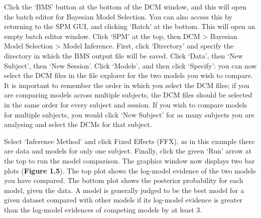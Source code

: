 Click the `BMS' button at the bottom of the DCM window, and this will
open the batch editor for Bayesian Model Selection. You can also access
this by returning to the SPM GUI, and clicking `Batch' at the bottom.
This will open an empty batch editor window. Click `SPM' at the top,
then DCM \textgreater{} Bayesian Model Selection \textgreater{} Model
Inference. First, click `Directory' and specify the directory in which
the BMS output file will be saved. Click `Data', then `New Subject',
then `New Session'. Click `Models', and then click `Specify': you can
now select the DCM files in the file explorer for the two models you
wish to compare. It is important to remember the order in which you
select the DCM files; if you are comparing models across multiple
subjects, the DCM files should be selected in the same order for every
subject and session. If you wish to compare models for multiple
subjects, you would click `New Subject' for as many subjects you are
analysing and select the DCMs for that subject.

Select `Inference Method' and click Fixed Effects (FFX), as in this
example there are data and models for only one subject. Finally, click
the green `Run' arrow at the top to run the model comparison. The
graphics window now displays two bar plots (\textbf{Figure 1.5}). The
top plot shows the log-model evidence of the two models you have
compared. The bottom plot shows the posterior probability for each
model, given the data. A model is generally judged to be the best model
for a given dataset compared with other models if its log-model evidence
is greater than the log-model evidences of competing models by at least
3.

